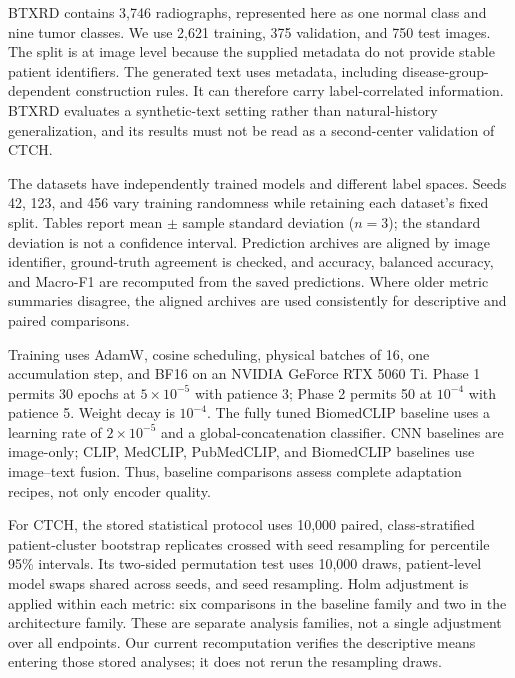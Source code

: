 \documentclass{llncs}
\begin{document}
BTXRD \cite{Yao2025} contains 3,746 radiographs, represented here as one normal class and nine tumor classes. We use 2,621 training, 375 validation, and 750 test images. The split is at image level because the supplied metadata do not provide stable patient identifiers. The generated text uses metadata, including disease-group-dependent construction rules. It can therefore carry label-correlated information. BTXRD evaluates a synthetic-text setting rather than natural-history generalization, and its results must not be read as a second-center validation of CTCH.

The datasets have independently trained models and different label spaces. Seeds 42, 123, and 456 vary training randomness while retaining each dataset's fixed split. Tables report mean $\pm$ sample standard deviation ($n=3$); the standard deviation is not a confidence interval. Prediction archives are aligned by image identifier, ground-truth agreement is checked, and accuracy, balanced accuracy, and Macro-F1 are recomputed from the saved predictions. Where older metric summaries disagree, the aligned archives are used consistently for descriptive and paired comparisons.

Training uses AdamW, cosine scheduling, physical batches of 16, one accumulation step, and BF16 on an NVIDIA GeForce RTX 5060 Ti. Phase 1 permits 30 epochs at $5\times10^{-5}$ with patience 3; Phase 2 permits 50 at $10^{-4}$ with patience 5. Weight decay is $10^{-4}$. The fully tuned BiomedCLIP baseline uses a learning rate of $2\times10^{-5}$ and a global-concatenation classifier. CNN baselines are image-only; CLIP, MedCLIP, PubMedCLIP, and BiomedCLIP baselines use image--text fusion. Thus, baseline comparisons assess complete adaptation recipes, not only encoder quality.

For CTCH, the stored statistical protocol uses 10,000 paired, class-stratified patient-cluster bootstrap replicates crossed with seed resampling for percentile 95\% intervals. Its two-sided permutation test uses 10,000 draws, patient-level model swaps shared across seeds, and seed resampling. Holm adjustment is applied within each metric: six comparisons in the baseline family and two in the architecture family. These are separate analysis families, not a single adjustment over all endpoints. Our current recomputation verifies the descriptive means entering those stored analyses; it does not rerun the resampling draws.
\end{document}
